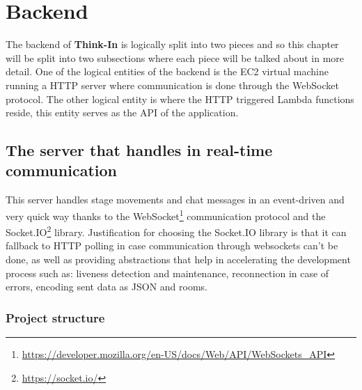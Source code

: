 \chapter{Backend}

The backend of \textbf{Think-In} is logically split into two pieces and so this chapter will be split into two subsections where each piece will be talked about in more detail. One of the logical entities of the backend is the EC2 virtual machine running a HTTP server where communication is done through the WebSocket protocol. The other logical entity is where the HTTP triggered Lambda functions reside, this entity serves as the API of the application. 

\section{The server that handles in real-time communication}

This server handles stage movements and chat messages in an event-driven and very quick way thanks to the WebSocket\footnote{\href{https://developer.mozilla.org/en-US/docs/Web/API/WebSockets\_API}{https://developer.mozilla.org/en-US/docs/Web/API/WebSockets\_API}}  communication protocol and the Socket.IO\footnote{\href{https://socket.io/}{https://socket.io/}} library. Justification for choosing the Socket.IO library is that it can fallback to HTTP polling in case communication through websockets can't be done, as well as providing abstractions that help in accelerating the development process such as: liveness detection 
and maintenance, reconnection in case of errors, encoding sent data as JSON and rooms.

\subsection{Project structure}

